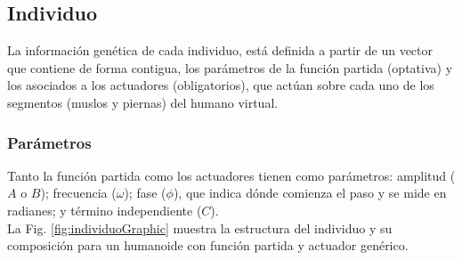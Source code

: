 \documentclass{article}
\begin{document}
\subsection{Individuo}

La informaci\'on gen\'etica de cada individuo, est\'a definida a partir de un vector que contiene de forma contigua, los par\'ametros de la funci\'on partida (optativa) y los asociados a los actuadores (obligatorios), que act\'uan sobre cada uno de los segmentos (muslos y piernas) del humano virtual. \\ 

\subsubsection{Par\'ametros}
\label{sub:parametros}
Tanto la funci\'on partida como los actuadores tienen como par\'ametros: amplitud ($A$ o $B$); frecuencia ($\omega$); fase ($\phi$), que indica d\'onde comienza el paso y se mide en radianes;  y t\'ermino independiente ($C$). \\
La Fig. \ref{fig:individuoGraphic} muestra la estructura del individuo y su composici\'on para un humanoide con funci\'on partida y actuador gen\'erico.\\
\end{document}
